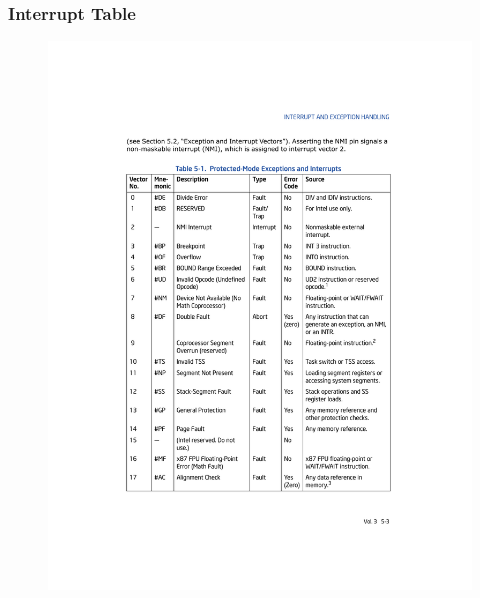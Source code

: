 \documentclass[aspectratio=169]{beamer}
\begin{document}
\begin{frame}    
    \frametitle{Interrupt Table}
    \vspace{-0.6cm}
    \begin{figure}
    \centering
    \includegraphics[scale=0.65]{img/tabla_int1_2}
    \end{figure}
    \vspace{-0.3cm}
    \begin{figure}
    \centering

\end{figure}
\end{frame}
\end{document}
